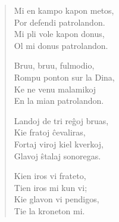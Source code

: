 \begin{verse}
                        Mi en kampo kapon metos,\\
                        Por defendi patrolandon.\\
                        Mi pli vole kapon donus,\\
                        Ol mi donus patrolandon.

                        Bruu, bruu, fulmodio,\\
                        Rompu ponton sur la Dina,\\
                        Ke ne venu malamikoj\\
                        En la mian patrolandon.

                        Landoj de tri re\^goj bruas,\\
                        Kie fratoj \^cevaliras,\\
                        Fortaj viroj kiel kverkoj,\\
                        Glavoj \^stalaj sonoregas.

                        Kien iros vi frateto,\\
                        Tien iros mi kun vi;\\
                        Kie glavon vi pendigos,\\
                        Tie la kroneton mi.

\end{verse}


\smallrule{}